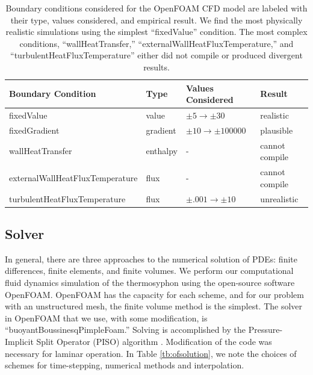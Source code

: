 \begin{table}
\begin{tabular}{llll}
\hline
Boundary Condition & Type & Values Considered & Result\\
\hline
\hline
fixedValue & value & $\pm 5 \to \pm 30$ & realistic\\
\hline
fixedGradient & gradient & $\pm 10 \to \pm 100000$ & plausible\\
\hline
wallHeatTransfer & enthalpy & - & cannot compile\\
\hline
externalWallHeatFluxTemperature & flux & - & cannot compile\\
\hline
turbulentHeatFluxTemperature & flux & $\pm .001 \to \pm10$ & unrealistic\\
\hline
\end{tabular}
\label{tb:ofbc}
\caption[Boundary conditions considered for the OpenFOAM CFD model are labeled with their type, values considered, and empirical result]{
  Boundary conditions considered for the OpenFOAM CFD model are labeled with their type, values considered, and empirical result.
  We find the most physically realistic simulations using the simplest ``fixedValue'' condition.
  The most complex conditions, ``wallHeatTransfer,'' ``externalWallHeatFluxTemperature,'' and ``turbulentHeatFluxTemperature'' either did not compile or produced divergent results.
  }
\end{table}

\subsection{Solver}

In general, there are three approaches to the numerical solution of PDEs: finite differences, finite elements, and finite volumes.
We perform our computational fluid dynamics simulation of the thermosyphon using the open-source software OpenFOAM.
OpenFOAM has the capacity for each scheme, and for our problem with an unstructured mesh, the finite volume method is the simplest.
The solver in OpenFOAM that we use, with some modification, is ``buoyantBoussinesqPimpleFoam.''
Solving is accomplished by the Pressure-Implicit Split Operator (PISO) algorithm .
Modification of the code was necessary for laminar operation.
In Table \ref{tb:ofsolution}, we note the choices of schemes for time-stepping, numerical methods and interpolation.


